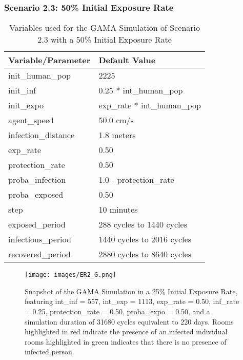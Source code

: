 \subsubsection{Scenario 2.3: 50\% Initial Exposure Rate}
\begin{table}[H]
	\centering
	\begin{tabular}{ll}
		\toprule
		\textbf{Variable/Parameter} & \textbf{Default Value}\\
		\hline
		init\_human\_pop & 2225\\
		init\_inf & 0.25 * int\_human\_pop\\
		init\_expo & exp\_rate * int\_human\_pop \\
		agent\_speed & 50.0 cm/s\\
		infection\_distance & 1.8 meters\\
		exp\_rate & 0.50\\
		protection\_rate & 0.50\\
		proba\_infection & 1.0 - protection\_rate\\
		proba\_exposed & 0.50\\
		step & 10 minutes\\
		exposed\_period & 288 cycles to 1440 cycles\\
		infectious\_period & 1440 cycles to 2016 cycles\\
		recovered\_period & 2880 cycles to 8640 cycles\\ 
		\bottomrule
	\end{tabular}
	\caption{Variables used for the GAMA Simulation of Scenario 2.3 with a 50\% Initial Exposure Rate}
	\label{2.1c}
\end{table}

	\begin{figure}[H]
	\centering
	\texttt{[image: images/ER2\_G.png]}
	\caption{Snapshot of the GAMA Simulation in a 25\% Initial Exposure Rate, featuring int\_inf = 557, int\_exp = 1113, exp\_rate = 0.50, inf\_rate = 0.25, protection\_rate = 0.50, proba\_expo = 0.50, and a simulation duration of 31680 cycles equivalent to 220 days. Rooms highlighted in red indicate the presence of an infected individual rooms highlighted in green indicates that there is no presence of infected person.}
	\label{ER4G}
\end{figure}

